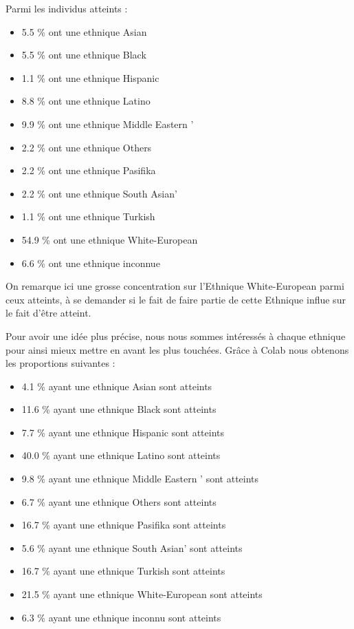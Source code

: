 \documentclass[12,french]{report}
\begin{document}
	Parmi les individus atteints :
\begin{itemize}
	\item 5.5 \% ont une ethnique  Asian
	\item 5.5 \% ont une ethnique  Black
	\item 1.1 \% ont une ethnique  Hispanic
	\item 8.8 \% ont une ethnique  Latino
	\item 9.9 \% ont une ethnique  Middle Eastern '
	\item 2.2 \% ont une ethnique  Others
	\item 2.2 \% ont une ethnique  Pasifika
	\item 2.2 \% ont une ethnique  South Asian'
	\item 1.1 \% ont une ethnique  Turkish
	\item 54.9 \% ont une ethnique  White-European
	\item 6.6 \% ont une ethnique  inconnue
\end{itemize}\vspace{0.3cm}

	On remarque ici une grosse concentration sur l’Ethnique White-European parmi ceux atteints, à se demander si le fait de faire partie de cette Ethnique influe sur le fait d’être atteint.
	
	Pour avoir une idée plus précise, nous nous sommes intéressés à chaque ethnique pour ainsi mieux mettre en avant les plus touchées. Grâce à Colab nous obtenons les proportions suivantes :\\
	
\begin{itemize}[label=$\blacksquare$]
	\item 4.1 \% ayant une ethnique  Asian  sont atteints
	\item 11.6 \% ayant une ethnique  Black  sont atteints
	\item 7.7 \% ayant une ethnique  Hispanic  sont atteints
	\item 40.0 \% ayant une ethnique  Latino  sont atteints
	\item 9.8 \% ayant une ethnique  Middle Eastern '  sont atteints
	\item 6.7 \% ayant une ethnique  Others  sont atteints
	\item 16.7 \% ayant une ethnique  Pasifika  sont atteints
	\item 5.6 \% ayant une ethnique  South Asian'  sont atteints
	\item 16.7 \% ayant une ethnique  Turkish  sont atteints
	\item 21.5 \% ayant une ethnique  White-European  sont atteints
	\item 6.3 \% ayant une ethnique  inconnu  sont atteints
\end{itemize}\vspace{0.3cm}
\end{document}
